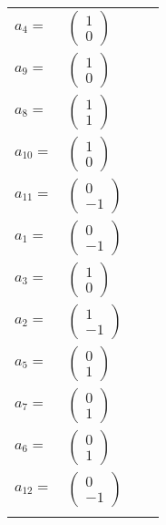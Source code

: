 \documentclass[1p]{elsarticle_modified}
\theoremstyle{definition}
\begin{document}
\begin{tabular}{m{7pt} m{180pt} m{7pt} m{180pt} }
\flushright $a_{4}=$&$\begin{pmatrix}1\\0\end{pmatrix}$ \\
\flushright $a_{9}=$&$\begin{pmatrix}1\\0\end{pmatrix}$ \\
\flushright $a_{8}=$&$\begin{pmatrix}1\\1\end{pmatrix}$ \\
\flushright $a_{10}=$&$\begin{pmatrix}1\\0\end{pmatrix}$ \\
\flushright $a_{11}=$&$\begin{pmatrix}0\\-1\end{pmatrix}$ \\
\flushright $a_{1}=$&$\begin{pmatrix}0\\-1\end{pmatrix}$ \\
\flushright $a_{3}=$&$\begin{pmatrix}1\\0\end{pmatrix}$ \\
\flushright $a_{2}=$&$\begin{pmatrix}1\\-1\end{pmatrix}$ \\
\flushright $a_{5}=$&$\begin{pmatrix}0\\1\end{pmatrix}$ \\
\flushright $a_{7}=$&$\begin{pmatrix}0\\1\end{pmatrix}$ \\
\flushright $a_{6}=$&$\begin{pmatrix}0\\1\end{pmatrix}$ \\
\flushright $a_{12}=$&$\begin{pmatrix}0\\-1\end{pmatrix}$\\&\end{tabular}
\end{document}
